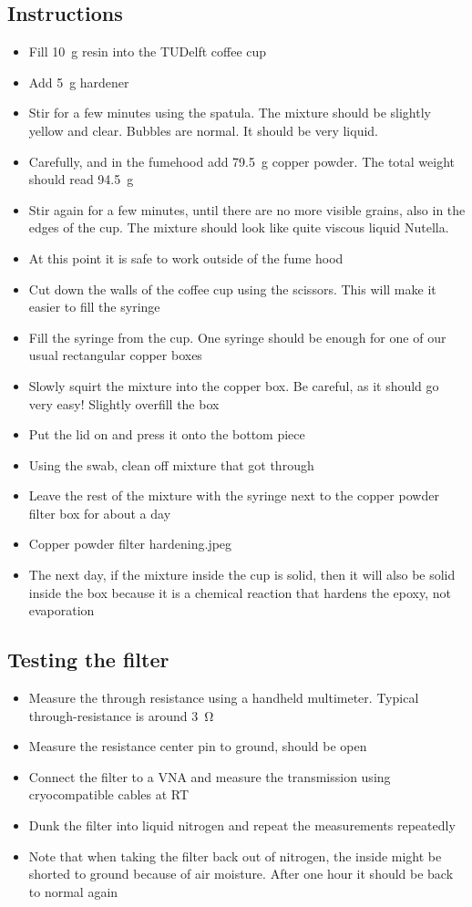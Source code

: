 \subsection{Instructions}
\begin{itemize}
	\item Fill \SI{10}{\gram} resin into the TUDelft coffee cup
	\item Add \SI{5}{\gram} hardener
	\item Stir for a few minutes using the spatula. The mixture should be slightly yellow and clear. Bubbles are normal. It should be very liquid.
	\item Carefully, and in the fumehood add \SI{79.5}{\gram} copper powder. The total weight should read \SI{94.5}{\gram}
	\item Stir again for a few minutes, until there are no more visible grains, also in the edges of the cup. The mixture should look like quite viscous liquid Nutella.
	\item At this point it is safe to work outside of the fume hood
	\item Cut down the walls of the coffee cup using the scissors. This will make it easier to fill the syringe
	\item Fill the syringe from the cup. One syringe should be enough for one of our usual rectangular copper boxes
	\item Slowly squirt the mixture into the copper box. Be careful, as it should go very easy! Slightly overfill the box
	\item Put the lid on and press it onto the bottom piece
	\item Using the swab, clean off mixture that got through
	\item Leave the rest of the mixture with the syringe next to the copper powder filter box for about a day
	\item Copper powder filter hardening.jpeg
	\item The next day, if the mixture inside the cup is solid, then it will also be solid inside the box because it is a chemical reaction that hardens the epoxy, not evaporation
\end{itemize}

\subsection{Testing the filter}
\begin{itemize}
	\item Measure the through resistance using a handheld multimeter. Typical through-resistance is around \SI{3}{\ohm}
	\item Measure the resistance center pin to ground, should be open
	\item Connect the filter to a VNA and measure the transmission using cryocompatible cables at RT
	\item Dunk the filter into liquid nitrogen and repeat the measurements repeatedly
	\item Note that when taking the filter back out of nitrogen, the inside might be shorted to ground because of air moisture. After one hour it should be back to normal again
\end{itemize}



